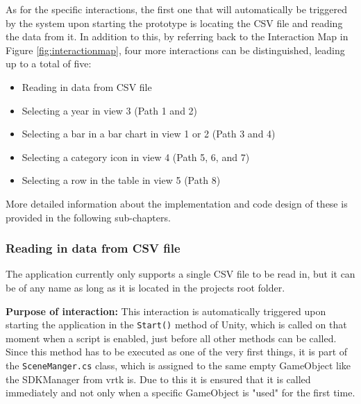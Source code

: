 As for the specific interactions, the first one that will automatically be triggered by the system upon starting the prototype is locating the CSV file and reading the data from it. In addition to this, by referring back to the Interaction Map in Figure \ref{fig:interactionmap}, four more interactions can be distinguished, leading up to a total of five:
\begin{itemize}[noitemsep,nolistsep]
	\item Reading in data from CSV file
	\item Selecting a year in view 3 (Path 1 and 2)
	\item Selecting a bar in a bar chart in view 1 or 2 (Path 3 and 4)
	\item Selecting a category icon in view 4 (Path 5, 6, and 7)
	\item Selecting a row in the table in view 5 (Path 8)
\end{itemize}
More detailed information about the implementation and code design of these is provided in the following sub-chapters.


\subsubsection{Reading in data from CSV file}

The application currently only supports a single CSV file to be read in, but it can be of any name as long as it is located in the projects root folder.

\textbf{Purpose of interaction:} This interaction is automatically triggered upon starting the application in the \texttt{Start()} method of Unity, which is called on that moment when a script is enabled, just before all other methods can be called. Since this method has to be executed as one of the very first things, it is part of the \texttt{SceneManger.cs} class, which is assigned to the same empty GameObject like the SDKManager from \gls{vrtk} is. Due to this it is ensured that it is called immediately and not only when a specific GameObject is "used" for the first time.

